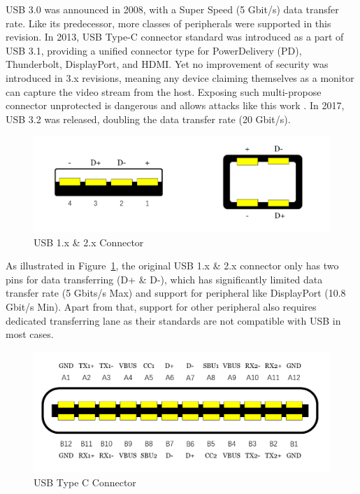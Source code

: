 USB 3.0\cite{usb30} was announced in 2008, with a Super Speed (5 Gbit/s) data
transfer rate. Like its predecessor, more classes of peripherals were supported
in this revision. In 2013, USB Type-C connector standard was introduced as a
part of USB 3.1\cite{usb31}, providing a unified connector type for
PowerDelivery (PD), Thunderbolt, DisplayPort, and HDMI.  Yet no improvement of
security was introduced in 3.x revisions, meaning any device claiming
themselves as a monitor can capture the video stream from the host. Exposing
such multi-propose connector unprotected is dangerous and allows attacks like
this work \tool. In 2017, USB 3.2\cite{usb32} was released, doubling the data
transfer rate (20 Gbit/s).

\begin{figure}[t]
    \centering
	\includegraphics[width=0.7\linewidth]{./Figs/usb_conn.png}
	\caption{USB 1.x \& 2.x Connector}
	\label{fig:usb_conn}
\end{figure}

As illustrated in Figure~\ref{fig:usb_conn}, the original USB 1.x \& 2.x
connector only has two pins for data transferring (D+ \& D-), which has
significantly limited data transfer rate (5 Gbits/s Max) and support for
peripheral like DisplayPort (10.8 Gbit/s Min). Apart from that, support for
other peripheral also requires dedicated transferring lane as their standards
are not compatible with USB in most cases.  \begin{figure}[t] \centering
\includegraphics[width=\linewidth]{./Figs/usb_c_conn.png} \caption{USB Type C
Connector} \label{fig:usb_c_conn} \end{figure}

